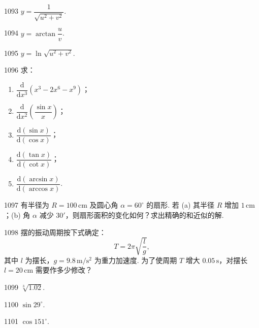 \begin{prob}[S]{1093}
$y = \dfrac{1}{\sqrt{u^2 + v^2}}$.
\end{prob}

\begin{prob}[S]{1094}
$y = \arctan \dfrac{u}{v}$.
\end{prob}

\begin{prob}[S]{1095}
$y = \ln\sqrt{u^2 + v^2}$.
\end{prob}

\begin{prob}[L]{1096}
求：
\begin{enumerate}[label=(\alph*), itemsep=2pt, topsep=3pt]
\item $\dfrac{\mathrm{d}}{\mathrm{d}x^3}(x^3 - 2x^6 - x^9)$；
\item $\dfrac{\mathrm{d}}{\mathrm{d}x^2}\left(\dfrac{\sin x}{x}\right)$；
\item $\dfrac{\mathrm{d}(\sin x)}{\mathrm{d}(\cos x)}$；
\item $\dfrac{\mathrm{d}(\tan x)}{\mathrm{d}(\cot x)}$；
\item $\dfrac{\mathrm{d}(\arcsin x)}{\mathrm{d}(\arccos x)}$.
\end{enumerate}
\end{prob}

\begin{prob}[M]{1097}
有半径为 $R = 100\,\mathrm{cm}$ 及圆心角 $\alpha = 60^\circ$ 的扇形. 若 (a) 其半径 $R$ 增加 $1\,\mathrm{cm}$；(b) 角 $\alpha$ 减少 $30'$，则扇形面积的变化如何？求出精确的和近似的解.
\end{prob}

\begin{prob}[M]{1098}
摆的振动周期按下式确定：
\[
T = 2\pi\sqrt{\frac{l}{g}},
\]
其中 $l$ 为摆长，$g = 9.8\,\mathrm{m/s^2}$ 为重力加速度.
为了使周期 $T$ 增大 $0.05\,\mathrm{s}$，对摆长 $l = 20\,\mathrm{cm}$ 需要作多少修改？
\end{prob}


\begin{prob}[S]{1099}
$\sqrt[3]{1.02}$.
\end{prob}

\begin{prob}[S]{1100}
$\sin 29^\circ$.
\end{prob}

\begin{prob}[S]{1101}
$\cos 151^\circ$.
\end{prob}

